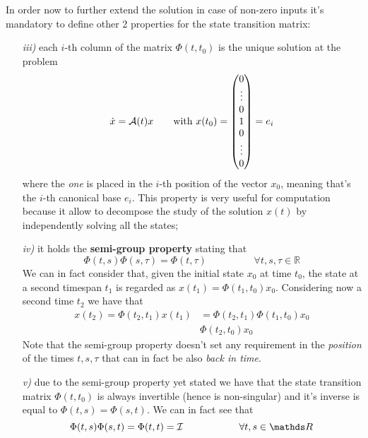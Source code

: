 	In order now to further extend the solution in case of non-zero inputs it's mandatory to define other 2 properties for the state transition matrix:	
	\begin{itemize}
		\item[\textit{iii)}] each $i$-th column of the matrix $\Phi(t,t_0)$ is the unique solution at the problem
		\[ \dot x = \mathcal{A}(t) x \qquad \textrm{with } x(t_0) = \begin{pmatrix} 0 \\ \vdots \\ 0 \\ 1 \\ 0 \\ \vdots \\ 0 \end{pmatrix} = e_i \] 
		where the \textit{one} is placed in the $i$-th position of the vector $x_0$, meaning that's the $i$-th canonical base $e_i$. This property is very useful for computation because it allow to decompose the study of the solution $x(t)$ by independently solving all the states;		
		
		\item[\textit{iv)}] it holds the \textbf{semi-group property} stating that 
		\[ \Phi(t,s) \Phi(s,\tau)= \Phi(t,\tau) \hspace{2cm} \forall t,s,\tau \in \mathds R \]
		We can in fact consider that, given the initial state $x_0$ at time $t_0$, the state at a second timespan $t_1$ is regarded as $x(t_1) = \Phi(t_1,t_0) x_0$. Considering now a second time $t_2$ we have that
		\begin{align*}
			x(t_2) = \Phi(t_2,t_1) x(t_1) & = \Phi(t_2,t_1) \Phi(t_1,t_0) x_0  \\
			& \Phi(t_2,t_0) x_0
		\end{align*}
		Note that the semi-group property doesn't set any requirement in the \textit{position} of the times $t,s,\tau$ that can in fact be also \textit{back in time}.
		
		\item[\textit{v)}] due to the semi-group property yet stated we have that the state transition matrix $\Phi(t,t_0)$ is always invertible (hence is non-singular) and it's inverse is equal to $\Phi(t,s) = \Phi(s,t)$. We can in fact see that 
		\[ \Phi(t,s) \Phi(s,t) = \Phi(t,t) = \I \hspace{2cm} \forall t,s \in \mathds R \] 
	\end{itemize}
	
